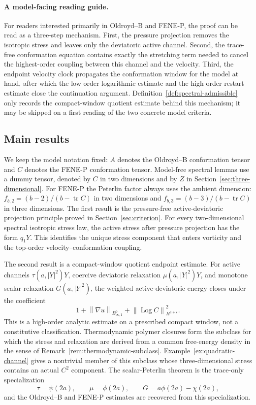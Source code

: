 \documentclass[11pt]{article}
\newcommand{\tr}{\operatorname{tr}}
\newcommand{\Log}{\operatorname{Log}}
\newcommand{\eps}{\varepsilon}
\newcommand{\norm}[1]{\left\lVert #1\right\rVert}
\newcommand{\Besov}{B^0_{\infty,1}}
\begin{document}
\paragraph{A model-facing reading guide.}
For readers interested primarily in Oldroyd--B and FENE-P, the proof can be
read as a three-step mechanism.  First, the pressure projection removes the
isotropic stress and leaves only the deviatoric active channel.  Second, the
trace-free conformation equation contains exactly the stretching term needed to
cancel the highest-order coupling between this channel and the velocity.  Third,
the endpoint velocity clock propagates the conformation window for the model at
hand, after which the low-order logarithmic estimate and the high-order restart
estimate close the continuation argument.  Definition~\ref{def:spectral-admissible}
only records the compact-window quotient estimate behind this mechanism; it may
be skipped on a first reading of the two concrete model criteria.

\subsection{Main results}
\label{subsec:main-results}

We keep the model notation fixed: \(A\) denotes the Oldroyd--B conformation
tensor and \(C\) denotes the FENE-P conformation tensor.  Model-free spectral
lemmas use a dummy tensor, denoted by \(C\) in two dimensions and by \(Z\) in
Section~\ref{sec:three-dimensional}.  For FENE-P the Peterlin factor always uses
the ambient dimension: \(f_{b,2}=(b-2)/(b-\tr C)\) in two dimensions and
\(f_{b,3}=(b-3)/(b-\tr C)\) in three dimensions.  The first result is the
pressure-free active-deviatoric projection principle proved in
Section~\ref{sec:criterion}.  For every two-dimensional spectral isotropic
stress law, the active stress after pressure projection has the form \(q_1Y\).
This identifies the unique stress component that enters vorticity and the
top-order velocity--conformation coupling.

The second result is a compact-window quotient endpoint estimate.  For active channels
\(\tau(a,|Y|^2)Y\), coercive deviatoric relaxation
\(\mu(a,|Y|^2)Y\), and monotone scalar relaxation \(G(a,|Y|^2)\), the weighted
active-deviatoric energy closes under the coefficient
\[
  1+\norm{\nabla u}_{\Besov}
  +\norm{\Log C}_{H^{1+\eps}}^2 .
\]
This is a high-order analytic estimate on a prescribed compact window, not a
constitutive classification.  Thermodynamic polymer closures form the
subclass for which the stress and relaxation are derived from a common
free-energy density in the sense of Remark~\ref{rem:thermodynamic-subclass}.
Example~\ref{ex:quadratic-channel} gives a nontrivial member of this subclass
whose three-dimensional stress contains an actual \(C^2\) component.
The scalar-Peterlin theorem is the trace-only specialization
\[
  \tau=\psi(2a),\qquad \mu=\phi(2a),\qquad
  G=a\phi(2a)-\chi(2a),
\]
and the Oldroyd--B and FENE-P estimates are recovered from this specialization.
\end{document}
